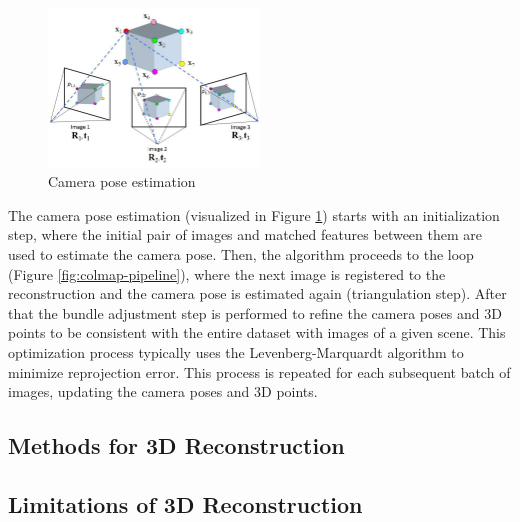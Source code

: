 \begin{figure}[h]
  \centering
  \includegraphics[width=0.5\textwidth]{images/related-work/Structure-from-Motion-SfM-process-is-illustrated-The-structure-in-the.png}
  \caption{Camera pose estimation}
  \label{fig:camera-pose-estimation}
\end{figure}

The camera pose estimation (visualized in Figure \ref{fig:camera-pose-estimation}) starts with an initialization step, where the initial pair of images and matched features between them are used to estimate the camera pose. Then, the algorithm proceeds to the loop (Figure \ref{fig:colmap-pipeline}), where the next image is registered to the reconstruction and the camera pose is estimated again (triangulation step). After that the bundle adjustment step is performed to refine the camera poses and 3D points to be consistent with the entire dataset with images of a given scene. This optimization process typically uses the Levenberg-Marquardt algorithm to minimize reprojection error. This process is repeated for each subsequent batch of images, updating the camera poses and 3D points.

\subsection{Methods for 3D Reconstruction}


\subsection{Limitations of 3D Reconstruction}

